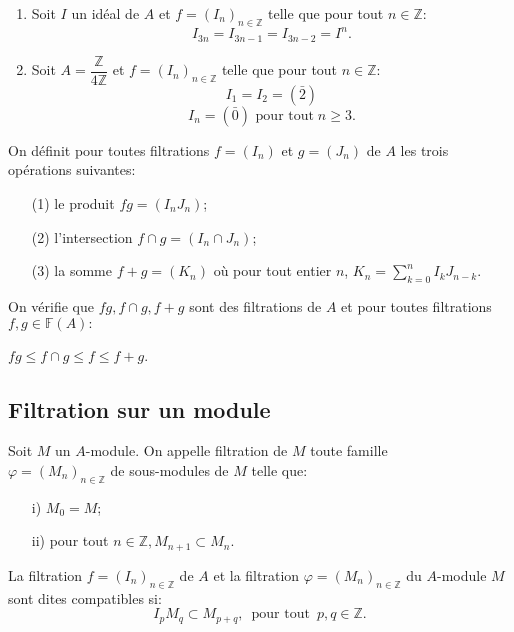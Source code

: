 \begin{monexemple}
	\begin{enumerate}
		\item 	Soit $I$ un idéal de $A$ et $f=(I_n)_{n \in \mathbb{Z}}$ telle que pour tout $n \in \mathbb{Z}$:
		$$I_{3n} = I_{3n-1} = I_{3n-2} =I^{n}. $$
		\item 	Soit $A = \dfrac{\mathbb{Z}}{4 \mathbb{Z}} $ et $f=(I_n)_{n \in \mathbb{Z}}$ telle que pour tout $n \in \mathbb{Z}$:
		$$I_1 = I_2 = (\bar{2})$$
		$$I_n = (\bar{0})  \text{ pour tout} \; n \geqslant 3. $$
	\end{enumerate}
\end{monexemple}
\begin{madefinition}
	On définit pour toutes filtrations $f=(I_n)$ et $g=(J_n)$ de $A$ les trois opérations suivantes: 
	\begin{enumerate}
		\item[(1)] le produit $fg=(I_nJ_n)$;
		\item[(2)] l'intersection $f \cap g = (I_n \cap J_n)$;
		\item[(3)] la somme $f+g=(K_n)$ où pour tout entier $n$, $K_n =\displaystyle  \sum_{k=0}^{n}I_{k}J_{n-k} $.
	\end{enumerate}
	On vérifie que $fg, f \cap g, f + g$ sont des filtrations de $A$ et pour toutes filtrations \\ $f,g \in \mathbb{F}(A):$
	\begin{center}
		$fg \leqslant f \cap g \leqslant f \leqslant f+g$.
	\end{center}
\end{madefinition}

\subsection{Filtration sur un module}
\begin{madefinition}
	Soit $M$ un $A$-module. On appelle filtration de $M$ toute famille \\ $\varphi = (M_n)_{n \in \mathbb{Z}}$ de sous-modules de $M$ telle que:
	\begin{enumerate}
		\item[i)] $M_0 = M$;
		\item[ii)] pour tout $n \in \mathbb{Z}, M_{n+1} \subset M_n$.
	\end{enumerate}
	
	La filtration $f = (I_n)_{n \in \mathbb{Z}}$ de $A$ et la filtration $\varphi = (M_n)_{n \in \mathbb{Z}}$ du $A$-module $M$ sont dites compatibles si:
	\[ I_p M_q \subset M_{p+q} ,\, \text{ pour tout } \, p, q \in \mathbb{Z}. \]
\end{madefinition}
